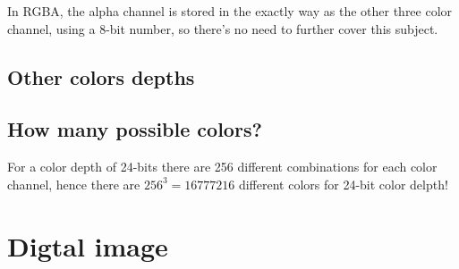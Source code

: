 
In RGBA, the alpha channel is stored in the exactly way as the other
three color channel, using a 8-bit number, so there's no need to
further cover this subject.

\subsection{Other colors depths}
\label{sec:other-colors-depths}

\subsection{How many possible colors?}
\label{sec:how-many-possible-colors}

For a color depth of 24-bits there are 256 different combinations for
each color channel, hence there are $256^3 = 16777216$ different
colors for 24-bit color delpth! %


\section{Digtal image}
\label{sec:digtal-image}

\cite{ohlsson99:_digit_bild_kreat}



\printbibliography[heading=subbibliography]